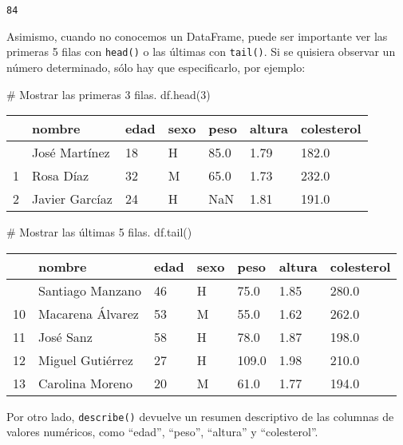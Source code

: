 \documentclass[
  letterpaper,
  DIV=11,
  numbers=noendperiod]{scrreprt}
\newenvironment{Shaded}{\begin{snugshade}}{\end{snugshade}}
\newcommand{\CommentTok}[1]{\textcolor[rgb]{0.37,0.37,0.37}{#1}}
\newcommand{\DecValTok}[1]{\textcolor[rgb]{0.68,0.00,0.00}{#1}}
\newcommand{\NormalTok}[1]{\textcolor[rgb]{0.00,0.23,0.31}{#1}}
\begin{document}
\begin{verbatim}
84
\end{verbatim}

Asimismo, cuando no conocemos un DataFrame, puede ser importante ver las
primeras 5 filas con \texttt{head()} o las últimas con \texttt{tail()}.
Si se quisiera observar un número determinado, sólo hay que
especificarlo, por ejemplo:

\begin{Shaded}
\begin{Highlighting}[]
\CommentTok{\# Mostrar las primeras 3 filas.}
\NormalTok{df.head(}\DecValTok{3}\NormalTok{)}
\end{Highlighting}
\end{Shaded}

\begin{longtable}[]{@{}lllllll@{}}
\toprule\noalign{}
& nombre & edad & sexo & peso & altura & colesterol \\
\midrule\noalign{}
\endhead
\bottomrule\noalign{}
\endlastfoot
0 & José Martínez & 18 & H & 85.0 & 1.79 & 182.0 \\
1 & Rosa Díaz & 32 & M & 65.0 & 1.73 & 232.0 \\
2 & Javier Garcíaz & 24 & H & NaN & 1.81 & 191.0 \\
\end{longtable}

\begin{Shaded}
\begin{Highlighting}[]
\CommentTok{\# Mostrar las últimas 5 filas.}
\NormalTok{df.tail()}
\end{Highlighting}
\end{Shaded}

\begin{longtable}[]{@{}lllllll@{}}
\toprule\noalign{}
& nombre & edad & sexo & peso & altura & colesterol \\
\midrule\noalign{}
\endhead
\bottomrule\noalign{}
\endlastfoot
9 & Santiago Manzano & 46 & H & 75.0 & 1.85 & 280.0 \\
10 & Macarena Álvarez & 53 & M & 55.0 & 1.62 & 262.0 \\
11 & José Sanz & 58 & H & 78.0 & 1.87 & 198.0 \\
12 & Miguel Gutiérrez & 27 & H & 109.0 & 1.98 & 210.0 \\
13 & Carolina Moreno & 20 & M & 61.0 & 1.77 & 194.0 \\
\end{longtable}

Por otro lado, \texttt{describe()} devuelve un resumen descriptivo de
las columnas de valores numéricos, como ``edad'', ``peso'', ``altura'' y
``colesterol''.
\end{document}
